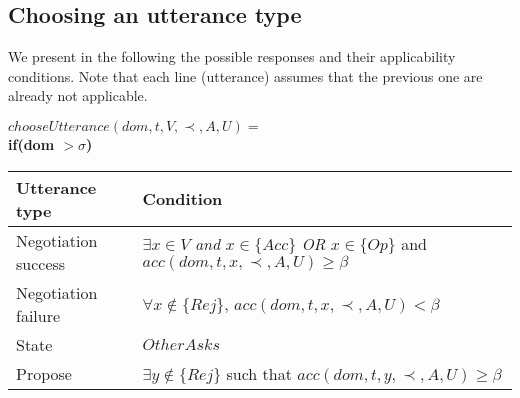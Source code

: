 \documentclass{article}
\begin{document}
	\subsection{Choosing an utterance type}
		
		We present in the following the possible responses and their applicability conditions. Note that each line (utterance)  assumes that the previous one are already not applicable.
	
	$ chooseUtterance(dom, t, V, \prec, A, U) = $ \\
	\textbf{if(\textbf{dom  $>\sigma$})} \\
	\begin{tabular}{|p{3cm}|p{9cm}|}
		\hline
		\textbf{Utterance type} & Condition \\
		\hline
	 Negotiation success &  $\exists x \in V$  \emph{and} $x \in \{Acc\}$  \newline \emph{OR} \newline $x \in \{Op\}$ and \newline $acc(dom,t,x,\prec,A,U) \geq \beta$ \\
		\hline
		Negotiation failure & $ \forall x \notin \{Rej\}$, \newline  $acc(dom,t,x,\prec,A,U) < \beta $ \\
		\hline
		State & $OtherAsks$ \\
		\hline
		Propose & $\exists y \notin \{Rej\}$ such that \newline $acc(dom,t,y,\prec,A,U) \geq \beta $  \\
		
	\hline
	\end{tabular}
	\\ \\
		
\end{document}
